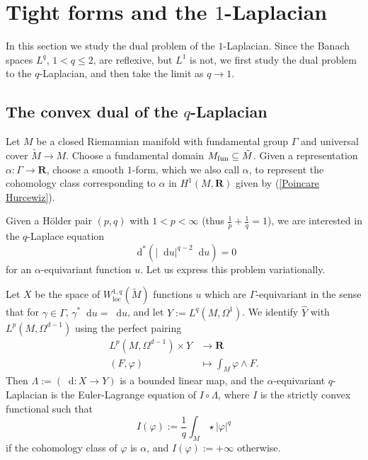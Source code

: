 \documentclass[reqno,11pt]{amsart}
\newcommand{\RR}{\mathbf{R}}
\newcommand*\dif{\mathop{}\!\mathrm{d}}
\newcommand{\loc}{\mathrm{loc}}
\theoremstyle{definition}
\numberwithin{equation}{section}
\begin{document}
\section{\texorpdfstring{Tight forms and the $1$-Laplacian}{Infinity-tight forms and the one-Laplacian}}\label{tight forms sec}
In this section we study the dual problem of the $1$-Laplacian.
Since the Banach spaces $L^q$, $1 < q \leq 2$, are reflexive, but $L^1$ is not, we first study the dual problem to the $q$-Laplacian, and then take the limit as $q \to 1$.


\subsection{The convex dual of the \texorpdfstring{$q$-Laplacian}{q-Laplacian}}
Let $M$ be a closed Riemannian manifold with fundamental group $\Gamma$ and universal cover $\tilde M \to M$.
Choose a fundamental domain $M_{\rm fun} \subseteq \tilde M$.
Given a representation $\alpha: \Gamma \to \RR$, choose a smooth $1$-form, which we also call $\alpha$, to represent the cohomology class corresponding to $\alpha$ in $H^1(M, \RR)$ given by (\ref{Poincare Hurcewiz}).

Given a H\"older pair $(p, q)$ with $1 < p < \infty$ (thus $\frac{1}{p} + \frac{1}{q} = 1$),
we are interested in the $q$-Laplace equation
$$\dif^* (|\dif u|^{q - 2} \dif u) = 0$$
for an $\alpha$-equivariant function $u$.
Let us express this problem variationally.

Let $X$ be the space of $W^{1, q}_\loc(\tilde M)$ functions $u$ which are $\Gamma$-equivariant in the sense that for $\gamma \in \Gamma$, $\gamma^* \dif u = \dif u$, and let $Y := L^q(M, \Omega^1)$.
We identify $\hat Y$ with $L^p(M, \Omega^{d - 1})$ using the perfect pairing 
\begin{align*}
	L^p(M, \Omega^{d - 1}) \times Y &\to \RR \\
	(F, \varphi) &\mapsto \int_M \varphi \wedge F.
\end{align*}
Then $\Lambda := (\dif: X \to Y)$ is a bounded linear map, and the $\alpha$-equivariant $q$-Laplacian is the Euler-Lagrange equation of $I \circ \Lambda$, where $I$ is the strictly convex functional such that
$$I(\varphi) := \frac{1}{q} \int_M \star |\varphi|^q$$
if the cohomology class of $\varphi$ is $\alpha$, and $I(\varphi) := +\infty$ otherwise.
\end{document}
